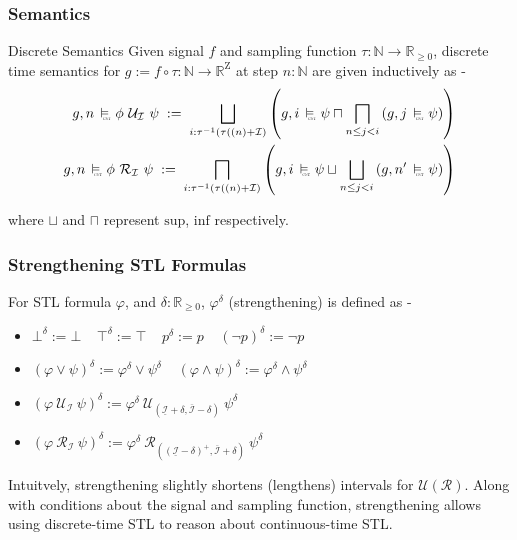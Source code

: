 \documentclass{beamer}
\newcommand{\typeTime}{\mathbb{R}_{\geq 0}}
\newcommand{\typeReal}{\mathbb{R}}
\newcommand{\typeNat}{\mathbb{N}}
\newcommand{\until}{\mathcal{U}}
\newcommand{\release}{\mathcal{R}}
\newcommand{\interval}{\mathcal{I}}
\newcommand{\Z}{\text{Z}}
\newcommand{\cont}{\raisebox{-0.1ex}{\scalebox{0.25}{\textrm{CNT}}}}
\newcommand{\contSatisfy}{\ \stackMath\stackunder[0pt]{\vDash}{\hspace*{0.3em}\cont}\ }
\newcommand{\robustAssign}{\; := \;}
\begin{document}
\begin{frame}
    \frametitle{Semantics}
    \begin{block}{Discrete Semantics}
        Given signal $f$ and sampling function $\tau : \typeNat
        \to \typeTime$, discrete time semantics for $g := f \circ \tau : \typeNat
        \to  \typeReal^{\Z}$ at step $n:\typeNat$ are given inductively as -
        \begin{align*}
            g, n \contSatisfy \phi\ \until_{\interval}\ \psi
            \robustAssign \bigsqcup_{i: \tau^{-1}(\tau((n) +\interval)}\left( g, i \contSatisfy \psi
           \sqcap \bigsqcap_{n \leq j < i} \left( g, j \contSatisfy \psi
            \right ) \right) \\
            g, n \contSatisfy \phi\ \release_{\interval}\ \psi
           \robustAssign \bigsqcap_{i: \tau^{-1}(\tau((n) +\interval)} \left( g, i \contSatisfy \psi
           \sqcup \bigsqcup_{n \leq j < i} \left( g, n' \contSatisfy \psi
            \right ) \right)
        \end{align*}
    \end{block}
    where $\sqcup$ and $\sqcap$ represent $\text{sup}$, $\text{inf}$ respectively.
\end{frame}

\begin{frame}
    \frametitle{Strengthening STL Formulas}
    For STL formula $\varphi$, and $\delta : \typeTime$,
    $\varphi^{\delta}$ (strengthening) is defined as -
    \begin{itemize}
        \item $\bot^{\delta} := \bot \;\;\;\; \top^{\delta} := \top   \;\;\;\; p^{\delta} := p
            \;\;\;\; (\neg p)^{\delta} := \neg p$
        \item $(\varphi \vee \psi)^{\delta} := \varphi^{\delta} \vee \psi^{\delta}
            \;\;\;\; (\varphi \wedge \psi)^{\delta} := \varphi^{\delta} \wedge \psi^{\delta}$
        \item $(\varphi\ \until_{\interval}\ \psi)^{\delta} := \varphi^{\delta} \
            \until_{\left (\underline{\interval} + \delta, \overline{\interval}
            - \delta \right)}\ \psi^{\delta}$
        \item $(\varphi\ \release_{\interval}\ \psi)^{\delta} := \varphi^{\delta} \
            \release_{\left ((\underline{\interval} - \delta)^{+}, \overline{\interval}
            + \delta \right)}\ \psi^{\delta}$
    \end{itemize}
    Intuitvely, strengthening slightly shortens (lengthens) intervals
    for $\until (\release) $. Along with conditions about the signal
    and sampling function, strengthening allows using discrete-time
    STL to reason about continuous-time STL.
\end{frame}
\end{document}
